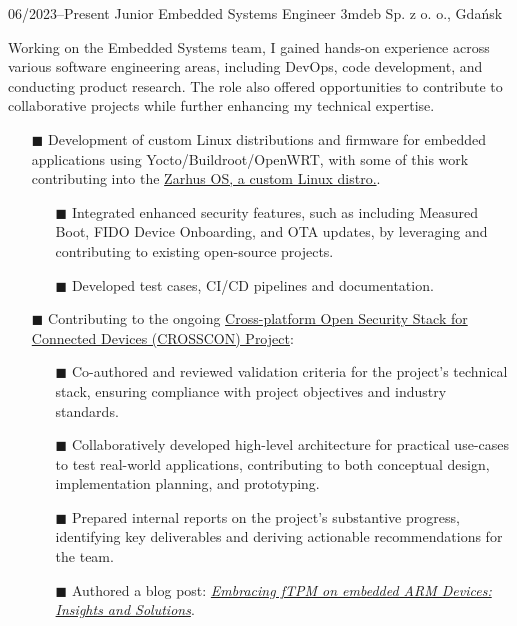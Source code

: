 \documentclass[9pt]{./src/packages/Developer_CV/developercv}
\begin{document}
\begin{entrylist}

    \entry
    {06/2023--Present}
    {Junior Embedded Systems Engineer}
    {3mdeb Sp. z o. o., Gdańsk}
    {
    Working on the Embedded Systems team, I gained hands-on experience across various software engineering areas, including DevOps, code development, and conducting product research. The role also offered opportunities to contribute to collaborative projects while further enhancing my technical expertise.
    \begin{enumerate}
        \raggedright
    \item[$\blacksquare$] Development of custom Linux distributions and firmware for embedded applications using Yocto/Buildroot/OpenWRT, with some of this work contributing into the \href{https://docs.zarhus.com/}{Zarhus OS, a custom Linux distro.}.
        \begin{enumerate}
            \item[$\blacksquare$] Integrated enhanced security features, such as including Measured Boot, FIDO Device Onboarding, and OTA updates, by leveraging and contributing to existing open-source projects.
            \item[$\blacksquare$] Developed test cases, CI/CD pipelines and documentation.
        \end{enumerate}
        \item[$\blacksquare$] Contributing to the ongoing \href{https://crosscon.eu/}{Cross-platform Open Security Stack for Connected Devices (CROSSCON) Project}:
        \begin{enumerate}
            \item[$\blacksquare$] Co-authored and reviewed validation criteria for the project's technical stack, ensuring compliance with project objectives and industry standards.
            \item[$\blacksquare$] Collaboratively developed high-level architecture for practical use-cases to test real-world applications, contributing to both conceptual design, implementation planning, and prototyping.
            \item[$\blacksquare$] Prepared internal reports on the project's substantive progress, identifying key deliverables and deriving actionable recommendations for the team.
            \item[$\blacksquare$] Authored a blog post: \href{https://crosscon.eu/blog/embracing-ftpm-embedded-arm-devices-insights-and-solutions}{\textit{Embracing fTPM on embedded ARM Devices: Insights and Solutions}}.

\end{enumerate}
\end{enumerate}}
\end{entrylist}
\end{document}
